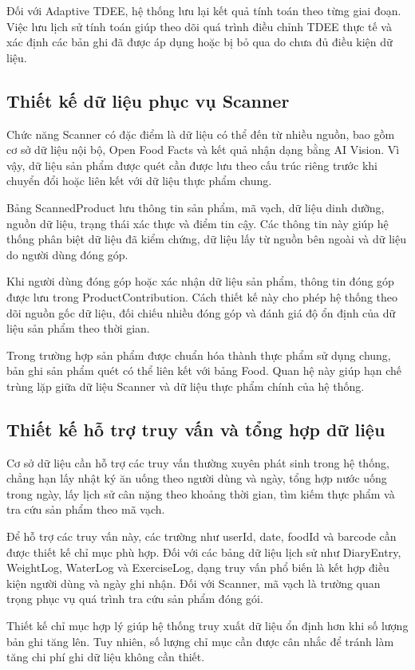 \documentclass[12pt, a4paper]{report}
\begin{document}
Đối với Adaptive TDEE, hệ thống lưu lại kết quả tính toán theo từng giai đoạn. Việc lưu lịch sử tính toán giúp theo dõi quá trình điều chỉnh TDEE thực tế và xác định các bản ghi đã được áp dụng hoặc bị bỏ qua do chưa đủ điều kiện dữ liệu.

\subsection{Thiết kế dữ liệu phục vụ Scanner}Chức năng Scanner có đặc điểm là dữ liệu có thể đến từ nhiều nguồn, bao gồm cơ sở dữ liệu nội bộ, Open Food Facts và kết quả nhận dạng bằng AI Vision. Vì vậy, dữ liệu sản phẩm được quét cần được lưu theo cấu trúc riêng trước khi chuyển đổi hoặc liên kết với dữ liệu thực phẩm chung.

Bảng ScannedProduct lưu thông tin sản phẩm, mã vạch, dữ liệu dinh dưỡng, nguồn dữ liệu, trạng thái xác thực và điểm tin cậy. Các thông tin này giúp hệ thống phân biệt dữ liệu đã kiểm chứng, dữ liệu lấy từ nguồn bên ngoài và dữ liệu do người dùng đóng góp.

Khi người dùng đóng góp hoặc xác nhận dữ liệu sản phẩm, thông tin đóng góp được lưu trong ProductContribution. Cách thiết kế này cho phép hệ thống theo dõi nguồn gốc dữ liệu, đối chiếu nhiều đóng góp và đánh giá độ ổn định của dữ liệu sản phẩm theo thời gian.

Trong trường hợp sản phẩm được chuẩn hóa thành thực phẩm sử dụng chung, bản ghi sản phẩm quét có thể liên kết với bảng Food. Quan hệ này giúp hạn chế trùng lặp giữa dữ liệu Scanner và dữ liệu thực phẩm chính của hệ thống.

\subsection{Thiết kế hỗ trợ truy vấn và tổng hợp dữ liệu}Cơ sở dữ liệu cần hỗ trợ các truy vấn thường xuyên phát sinh trong hệ thống, chẳng hạn lấy nhật ký ăn uống theo người dùng và ngày, tổng hợp nước uống trong ngày, lấy lịch sử cân nặng theo khoảng thời gian, tìm kiếm thực phẩm và tra cứu sản phẩm theo mã vạch.

Để hỗ trợ các truy vấn này, các trường như userId, date, foodId và barcode cần được thiết kế chỉ mục phù hợp. Đối với các bảng dữ liệu lịch sử như DiaryEntry, WeightLog, WaterLog và ExerciseLog, dạng truy vấn phổ biến là kết hợp điều kiện người dùng và ngày ghi nhận. Đối với Scanner, mã vạch là trường quan trọng phục vụ quá trình tra cứu sản phẩm đóng gói.

Thiết kế chỉ mục hợp lý giúp hệ thống truy xuất dữ liệu ổn định hơn khi số lượng bản ghi tăng lên. Tuy nhiên, số lượng chỉ mục cần được cân nhắc để tránh làm tăng chi phí ghi dữ liệu không cần thiết.
\end{document}
